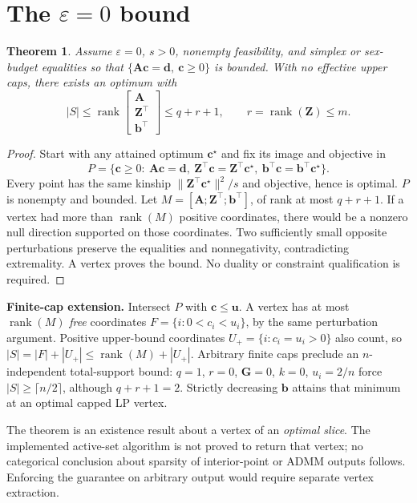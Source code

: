 \documentclass[11pt]{article}
\theoremstyle{plain}
\newtheorem{theorem}{Theorem}
\newcommand{\tp}{^{\top}}
\newcommand{\bc}{\mathbf{c}}
\newcommand{\bb}{\mathbf{b}}
\newcommand{\bG}{\mathbf{G}}
\newcommand{\bZ}{\mathbf{Z}}
\newcommand{\bA}{\mathbf{A}}
\newcommand{\bd}{\mathbf{d}}
\newcommand{\bu}{\mathbf{u}}
\begin{document}
\section{The \texorpdfstring{$\varepsilon = 0$}{eps=0} bound}\label{sec:eps0}

\begin{theorem}\label{thm:eps0}
Assume $\varepsilon=0$, $s>0$, nonempty feasibility, and simplex or sex-budget equalities so that $\{\bA\bc=\bd,\ \bc\ge0\}$ is bounded. With no effective upper caps, there exists an optimum with
\[
 |S|\le\operatorname{rank}\!\begin{bmatrix}\bA\\\bZ\tp\\\bb\tp\end{bmatrix}\le q+r+1,
 \qquad r=\operatorname{rank}(\bZ)\le m.
\]
\end{theorem}
\begin{proof}
Start with any attained optimum $\bc^\star$ and fix its image and objective in
\[
 P=\{\bc\ge0:\ \bA\bc=\bd,\ \bZ\tp\bc=\bZ\tp\bc^\star,\ \bb\tp\bc=\bb\tp\bc^\star\}.
\]
Every point has the same kinship $\|\bZ\tp\bc^\star\|^2/s$ and objective, hence is optimal. $P$ is nonempty and bounded. Let $M=[\bA;\bZ\tp;\bb\tp]$, of rank at most $q+r+1$. If a vertex had more than $\operatorname{rank}(M)$ positive coordinates, there would be a nonzero null direction supported on those coordinates. Two sufficiently small opposite perturbations preserve the equalities and nonnegativity, contradicting extremality. A vertex proves the bound. No duality or constraint qualification is required.
\end{proof}

\textbf{Finite-cap extension.} Intersect $P$ with $\bc\le\bu$. A vertex has at most $\operatorname{rank}(M)$ \emph{free} coordinates $F=\{i:0<c_i<u_i\}$, by the same perturbation argument. Positive upper-bound coordinates $U_+=\{i:c_i=u_i>0\}$ also count, so $|S|=|F|+|U_+|\le\operatorname{rank}(M)+|U_+|$. Arbitrary finite caps preclude an $n$-independent total-support bound: $q=1$, $r=0$, $\bG=0$, $k=0$, $u_i=2/n$ force $|S|\ge\lceil n/2\rceil$, although $q+r+1=2$. Strictly decreasing $\bb$ attains that minimum at an optimal capped LP vertex.

The theorem is an existence result about a vertex of an \emph{optimal slice}. The implemented active-set algorithm is not proved to return that vertex; no categorical conclusion about sparsity of interior-point or ADMM outputs follows. Enforcing the guarantee on arbitrary output would require separate vertex extraction.
\end{document}
